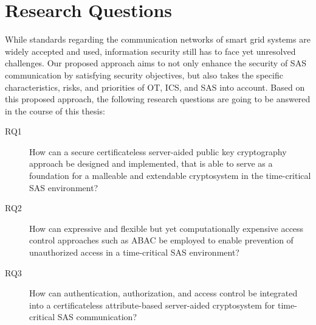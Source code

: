 \section{Research Questions}
\label{sec:research_questions}
While standards regarding the communication networks of smart grid systems are widely accepted and used, information security still has to face yet unresolved challenges.
Our proposed approach aims to not only enhance the security of SAS communication by satisfying security objectives, but also takes the specific characteristics, risks, and priorities of OT, ICS, and SAS into account.
Based on this proposed approach, the following research questions are going to be answered in the course of this thesis:
\begin{description}
    \item[RQ1] How can a secure certificateless server-aided public key cryptography approach be designed and implemented, that is able to serve as a foundation for a malleable and extendable cryptosystem in the time-critical SAS environment?\\
    \item[RQ2] How can expressive and flexible but yet computationally expensive access control approaches such as ABAC be employed to enable prevention of unauthorized access in a time-critical SAS environment?\\
    \item[RQ3] How can authentication, authorization, and access control be integrated into a certificateless attribute-based server-aided cryptosystem for time-critical SAS communication?
\end{description}
